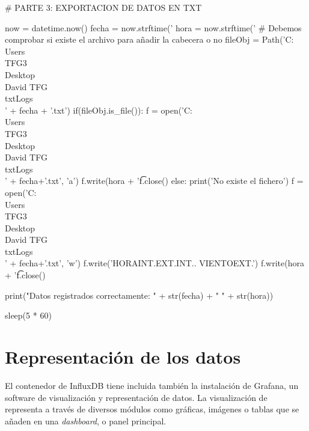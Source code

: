 \begin{python}
    # PARTE 3: EXPORTACION DE DATOS EN TXT

    now = datetime.now()
    fecha = now.strftime('%
    hora = now.strftime('%
    # Debemos comprobar si existe el archivo para añadir la cabecera o no
    fileObj = Path('C:\\Users\\TFG3\\Desktop\\David TFG\\txtLogs\\' + fecha + '.txt')
    if(fileObj.is_file()):
        f = open('C:\\Users\\TFG3\\Desktop\\David TFG\\txtLogs\\' + fecha+'.txt', 'a')
        f.write(hora + '\t%
        f.close()
    else:
        print('No existe el fichero')
        f = open('C:\\Users\\TFG3\\Desktop\\David TFG\\txtLogs\\' + fecha+'.txt', 'w')
        f.write('HORA\tTEMPERATURA INT.\tTEMPERATURA EXT.\tHUMEDAD INT.\tVEL. VIENTO\tLUMINOSIDAD EXT.\tLLUVIA\n')
        f.write(hora + '\t%
        f.close()
    
    print("Datos registrados correctamente: " + str(fecha) + " " + str(hora))

    sleep(5 * 60)
\end{python}

\section{Representación de los datos}

El contenedor de InfluxDB tiene incluida también la instalación de Grafana, un software de visualización y representación de datos. La visualización de representa a través de diversos módulos como gráficas, imágenes o tablas que se añaden en una \textit{dashboard}, o panel principal.

